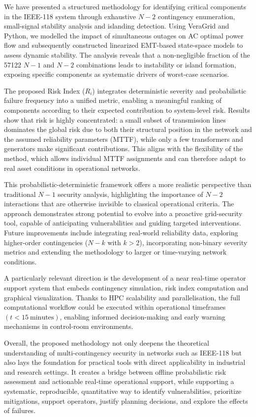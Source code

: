 \documentclass[journal]{IEEEtran}
\begin{document}
We have presented a structured methodology for identifying critical components in the IEEE-118 system through exhaustive $N-2$ contingency enumeration, small-signal stability analysis and islanding detection. Using VeraGrid and Python, we modelled the impact of simultaneous outages on AC optimal power flow and subsequently constructed linearized EMT-based state-space models to assess dynamic stability. The analysis reveals that a non-negligible fraction of the \num{57122} $N-1$ and $N-2$ combinations leads to instability or island formation, exposing specific components as systematic drivers of worst-case scenarios.

The proposed Risk Index ($R_i$) integrates deterministic severity and probabilistic failure frequency into a unified metric, enabling a meaningful ranking of components according to their expected contribution to system-level risk. Results show that risk is highly concentrated: a small subset of transmission lines dominates the global risk due to both their structural position in the network and the assumed reliability parameters (MTTF), while only a few transformers and generators make significant contributions. This aligns with the flexibility of the method, which allows individual MTTF assignments and can therefore adapt to real asset conditions in operational networks.

This probabilistic-deterministic framework offers a more realistic perspective than traditional $N-1$ security analysis, highlighting the importance of $N-2$ interactions that are otherwise invisible to classical operational criteria. The approach demonstrates strong potential to evolve into a proactive grid-security tool, capable of anticipating vulnerabilities and guiding targeted interventions. Future improvements include integrating real-world reliability data, exploring higher-order contingencies ($N-k$ with $k>2$), incorporating non-binary severity metrics and extending the methodology to larger or time-varying network conditions.

A particularly relevant direction is the development of a near real-time operator support system that embeds contingency simulation, risk index computation and graphical visualization. Thanks to HPC scalability and parallelisation, the full computational workflow could be executed within operational timeframes $(t<15\ \text{minutes})$, enabling informed decision-making and early warning mechanisms in control-room environments.

Overall, the proposed methodology not only deepens the theoretical understanding of multi-contingency security in networks such as IEEE-118 but also lays the foundation for practical tools with direct applicability in industrial and research settings. It creates a bridge between offline probabilistic risk assessment and actionable real-time operational support, while supporting a systematic, reproducible, quantitative way to identify vulnerabilities, prioritize mitigations, support operators, justify planning decisions, and explore the effects of failures.
\end{document}
